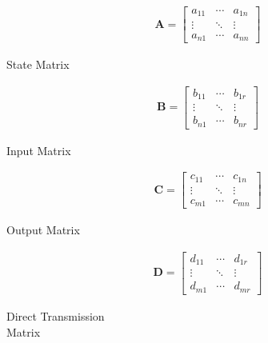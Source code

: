 \documentclass[a4paper]{article}
\begin{document}
\begin{minipage}{0.25\textwidth}
\begin{align*}
    \mathbf{A} =
    \begin{bmatrix}
    a_{11} & \cdots & a_{1n}\\
    \vdots & \ddots & \vdots\\
    a_{n1} & \cdots & a_{nn}
    \end{bmatrix}
\end{align*}
\begin{center}
    State Matrix
\end{center}
\end{minipage}
\begin{minipage}{0.25\textwidth}
\begin{align*}
    \mathbf{B} = 
    \begin{bmatrix}
    b_{11} & \cdots & b_{1r}\\
    \vdots & \ddots & \vdots\\
    b_{n1} & \cdots & b_{nr}
    \end{bmatrix}
\end{align*}
\begin{center}
    Input Matrix
\end{center}
\end{minipage}
\begin{minipage}{0.25\textwidth}
\begin{align*}
    \mathbf{C} =
    \begin{bmatrix}
    c_{11} & \cdots & c_{1n}\\
    \vdots & \ddots & \vdots\\
    c_{m1} & \cdots & c_{mn}
    \end{bmatrix}
\end{align*}
\begin{center}
    Output Matrix
\end{center}
\end{minipage}
\begin{minipage}{0.25\textwidth}
\begin{align*}
    \mathbf{D} = 
    \begin{bmatrix}
    d_{11} & \cdots & d_{1r}\\
    \vdots & \ddots & \vdots\\
    d_{m1} & \cdots & d_{mr}
    \end{bmatrix}
\end{align*}
\begin{center}
    Direct Transmission\\Matrix
\end{center}
\end{minipage}
\end{document}
